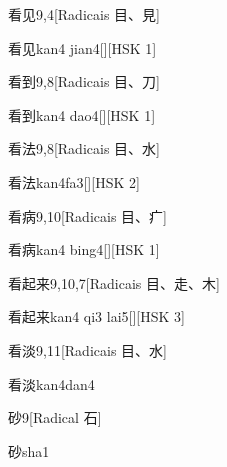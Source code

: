 \begin{entry}{看见}{9,4}[Radicais ⽬、⾒]
  \begin{phonetics}{看见}{kan4 jian4}[][HSK 1]
  \end{phonetics}
\end{entry}

\begin{entry}{看到}{9,8}[Radicais ⽬、⼑]
  \begin{phonetics}{看到}{kan4 dao4}[][HSK 1]
  \end{phonetics}
\end{entry}

\begin{entry}{看法}{9,8}[Radicais ⽬、⽔]
  \begin{phonetics}{看法}{kan4fa3}[][HSK 2]
  \end{phonetics}
\end{entry}

\begin{entry}{看病}{9,10}[Radicais ⽬、⽧]
  \begin{phonetics}{看病}{kan4 bing4}[][HSK 1]
  \end{phonetics}
\end{entry}

\begin{entry}{看起来}{9,10,7}[Radicais ⽬、⾛、⽊]
  \begin{phonetics}{看起来}{kan4 qi3 lai5}[][HSK 3]
  \end{phonetics}
\end{entry}

\begin{entry}{看淡}{9,11}[Radicais ⽬、⽔]
  \begin{phonetics}{看淡}{kan4dan4}
  \end{phonetics}
\end{entry}

\begin{entry}{砂}{9}[Radical ⽯]
  \begin{phonetics}{砂}{sha1}
  \end{phonetics}
\end{entry}

